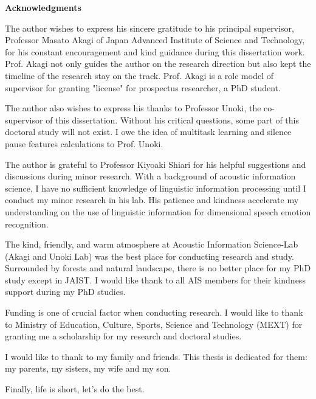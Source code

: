\strut
\vspace{20pt}

\begin{center}
{\LARGE\bf Acknowledgments}
\end{center}
\vspace{20pt}

The author wishes to express his sincere gratitude to his principal supervisor,
Professor Masato Akagi of Japan Advanced Institute of Science and Technology,
for his constant encouragement and kind guidance during this dissertation work.
Prof. Akagi not only guides the author on the research direction but also kept
the timeline of the research stay on the track. Prof. Akagi is a role model of
supervisor for granting "license" for prospectus researcher, a PhD student. 

The author also wishes to express his thanks to Professor Unoki, the
co-supervisor of this dissertation. Without his critical questions, some 
part of this doctoral study will not exist. I owe the idea of multitask
learning and silence pause features calculations to Prof. Unoki.

The author is grateful to Professor Kiyoaki Shiari for his helpful
suggestions and discussions during minor research. With a background of acoustic
information science, I have no sufficient knowledge of linguistic information 
processing until I conduct my minor research in his lab. His patience and
kindness accelerate my understanding on the use of linguistic information 
for dimensional speech emotion recognition.

The kind, friendly, and warm atmosphere at Acoustic Information Science-Lab
(Akagi and Unoki Lab) was the best place for conducting research and study.
Surrounded by forests and natural landscape, there is no better place for my PhD
study except in JAIST. I would like thank to all AIS members for their kindness
support during my PhD studies.

Funding is one of crucial factor when conducting research. I would like to 
thank to Ministry of Education, Culture, Sports, Science and Technology (MEXT) 
for granting me a scholarship for my research and doctoral studies.

I would like to thank to my family and friends. This thesis is
dedicated for them: my parents, my sisters, my wife and my son. 

Finally, life is short, let's do the best.